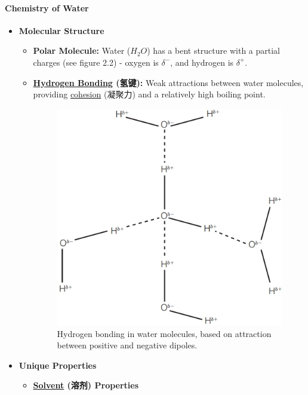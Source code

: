 \paragraph{Chemistry of Water}
\begin{itemize}
    \item \textbf{Molecular Structure}
    \begin{itemize}
        \item \textbf{Polar Molecule:} Water ($H_2O$) has a bent structure with a partial charges (see figure 2.2) - oxygen is
        $\delta^-$, and hydrogen is $\delta^+$.
        \item \textbf{\underline{Hydrogen Bonding} (氢键):} Weak attractions between water molecules, providing
        \underline{cohesion} (凝聚力) and a relatively high boiling point.
        \begin{figure}[H]
            \centering
            \includegraphics[scale=0.3]{Biology/1A/Images/1A-1-5.png}
            \caption{Hydrogen bonding in water molecules, based on attraction between positive and negative dipoles.}
        \end{figure}
    \end{itemize}
    \item \textbf{Unique Properties}
    \begin{itemize}
        \item \textbf{\underline{Solvent} (溶剂) Properties}
        \begin{itemize}

\end{itemize}
\end{itemize}
\end{itemize}
